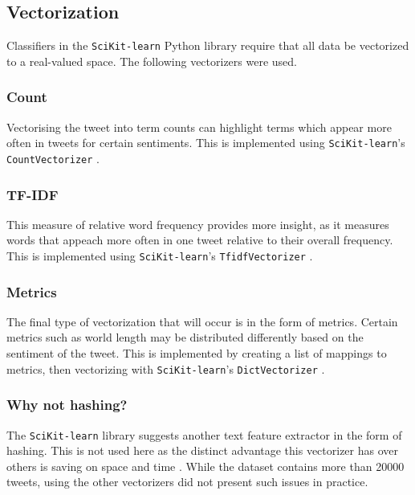 \documentclass[11pt]{article}
\begin{document}
\subsection{Vectorization}

Classifiers in the \texttt{SciKit-learn} {P}ython library require that all data be vectorized to a real-valued space.
The following vectorizers were used.

\subsubsection{Count}

Vectorising the tweet into term counts can highlight terms which appear more often in tweets for certain sentiments.
This is implemented using \texttt{SciKit-learn}'s \texttt{CountVectorizer} \cite{skl}.

\subsubsection{TF-IDF}

This measure of relative word frequency provides more insight, 
as it measures words that appeach more often in one tweet relative to their overall frequency.
This is implemented using \texttt{SciKit-learn}'s \texttt{TfidfVectorizer} \cite{skl}.

\subsubsection{Metrics}

The final type of vectorization that will occur is in the form of metrics. 
Certain metrics such as world length may be distributed differently based on the sentiment of the tweet.
This is implemented by creating a list of mappings to metrics, then vectorizing with \texttt{SciKit-learn}'s \texttt{DictVectorizer} \cite{skl}.

\subsubsection{Why not hashing?}

The \texttt{SciKit-learn} library suggests another text feature extractor in the form of hashing.
This is not used here as the distinct advantage this vectorizer has over others is saving on space and time \cite{skl}.
While the dataset contains more than 20000 tweets, using the other vectorizers did not present such issues in practice.
\end{document}
